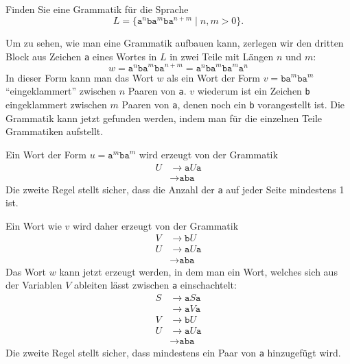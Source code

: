 Finden Sie eine Grammatik für die Sprache
\[
L=\{
\texttt{a}^n\texttt{ba}^m\texttt{ba}^{n+m}
\mid n,m>0
\}.
\]


\begin{loesung}
Um zu sehen, wie man eine Grammatik aufbauen kann, zerlegen wir den
dritten Block aus Zeichen \texttt{a} eines Wortes in $L$ in zwei
Teile mit Längen $n$ und $m$:
\[
w
=
\texttt{a}^n\texttt{ba}^m\texttt{ba}^{n+m}
=
\texttt{a}^n\texttt{ba}^m\texttt{ba}^m \texttt{a}^n
\]
In dieser Form kann man das Wort $w$ als ein Wort der Form
$v=\texttt{ba}^m\texttt{ba}^m$ ``eingeklammert'' zwischen $n$ Paaren von
\texttt{a}.
$v$ wiederum ist ein Zeichen \texttt{b} eingeklammert zwischen $m$ Paaren
von \texttt{a}, denen noch ein \texttt{b} vorangestellt ist.
Die Grammatik kann jetzt gefunden werden, indem man für die einzelnen
Teile Grammatiken aufstellt.

Ein Wort der Form $u=\texttt{a}^m\texttt{ba}^m$ wird erzeugt von der Grammatik
\begin{align*}
U&\to \texttt{a}U\texttt{a} \\
 &\to \texttt{aba}
\end{align*}
Die zweite Regel stellt sicher, dass die Anzahl der \texttt{a} auf jeder
Seite mindestens 1 ist.

Ein Wort wie $v$ wird daher erzeugt von der Grammatik
\begin{align*}
V&\to \texttt{b}U \\
U&\to \texttt{a}U\texttt{a} \\
 &\to \texttt{aba}
\end{align*}
Das Wort $w$ kann jetzt erzeugt werden, in dem man ein Wort, welches sich
aus der Variablen $V$ ableiten lässt zwischen \texttt{a} einschachtelt:
\begin{align*}
S&\to \texttt{a}S\texttt{a}\\
 &\to \texttt{a}V\texttt{a}\\
V&\to \texttt{b}U \\
U&\to \texttt{a}U\texttt{a} \\
 &\to \texttt{aba}
\end{align*}
Die zweite Regel stellt sicher, dass mindestens ein Paar von \texttt{a}
hinzugefügt wird.
\end{loesung}
